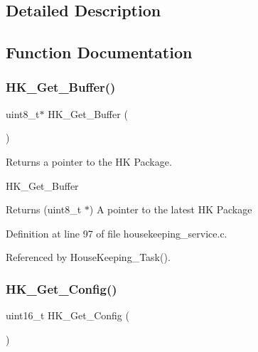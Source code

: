 \subsection{Detailed Description}


\subsection{Function Documentation}
\mbox{\label{group___housekeeping___service_ga18db64c11f8d6334b8e954d70da0045e}} 
\subsubsection{\texorpdfstring{H\+K\+\_\+\+Get\+\_\+\+Buffer()}{HK\_Get\_Buffer()}}
{\footnotesize\ttfamily uint8\+\_\+t$\ast$ H\+K\+\_\+\+Get\+\_\+\+Buffer (\begin{DoxyParamCaption}{ }\end{DoxyParamCaption})}



Returns a pointer to the HK Package. 

H\+K\+\_\+\+Get\+\_\+\+Buffer

\begin{DoxyReturn}{Returns}
(uint8\+\_\+t $\ast$) A pointer to the latest HK Package 
\end{DoxyReturn}


Definition at line 97 of file housekeeping\+\_\+service.\+c.



Referenced by House\+Keeping\+\_\+\+Task().

\mbox{\label{group___housekeeping___service_ga8f8a150f9356f9acaa04e0fa6845c665}} 
\subsubsection{\texorpdfstring{H\+K\+\_\+\+Get\+\_\+\+Config()}{HK\_Get\_Config()}}
{\footnotesize\ttfamily uint16\+\_\+t H\+K\+\_\+\+Get\+\_\+\+Config (\begin{DoxyParamCaption}{ }\end{DoxyParamCaption})}



